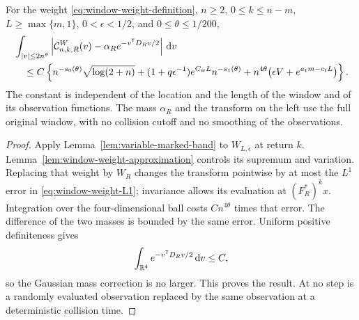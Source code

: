 \begin{theorem}
\label{thm:window-central-integral}
For the weight \eqref{eq:window-weight-definition}, $n\ge2$,
$0\le k\le n-m$, $L\ge\max\{m,1\}$, $0<\epsilon<1/2$, and
$0\le\theta\le1/200$,
\begin{align}
 &\int_{|v|\le2n^\theta}
 \left|\mathcal C_{n,k,R}^{W}(v)
                       -\alpha_R e^{-v^{\mathsf T}D_Rv/2}\right|\dd v
 \notag\\
 &\quad\le C\left\{
 n^{-s_0(\theta)}\sqrt{\log(2+n)}
 +(1+q\epsilon^{-1})e^{C_{\mathrm w}L}n^{-s_1(\theta)}
 +n^{4\theta}\bigl(\epsilon V+
                         e^{a_{\mathrm t}m-c_{\mathrm t}L}\bigr)
                      \right\}.
       \label{eq:window-central-integral}
\end{align}
The constant is independent of the location and the length of the
window and of its observation functions. The mass $\alpha_R$ and
the transform on the left use the full original window, with no
collision cutoff and no smoothing of the observations.
\end{theorem}
\begin{proof}
Apply Lemma~\ref{lem:variable-marked-band} to $W_{L,\epsilon}$ at
return $k$. Lemma~\ref{lem:window-weight-approximation} controls its
supremum and variation. Replacing that weight by $W_R$ changes the
transform pointwise by at most the $L^1$ error in
\eqref{eq:window-weight-L1}; invariance allows its evaluation at
$(F_R^*)^k x$. Integration over the four-dimensional ball costs
$Cn^{4\theta}$ times that error. The difference of the two masses
is bounded by the same error. Uniform positive definiteness gives
\[
 \int_{\mathbb R^4}e^{-v^{\mathsf T}D_Rv/2}\,\mathrm d v\le C,
\]
so the Gaussian mass correction is no larger. This proves the result.
At no step is a randomly evaluated observation replaced by the same
observation at a deterministic collision time.
\end{proof}

